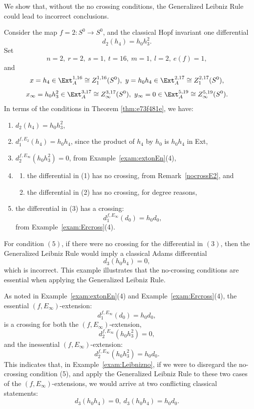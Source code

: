\documentclass{amsart}
\numberwithin{equation}{section}
\begin{document}
\begin{example} \label{exam:Leibnizno}
    We show that, without the no crossing conditions, the Generalized Leibniz Rule could lead to incorrect conclusions. 

    Consider the map $f=2: S^0 \rightarrow S^0$, and the classical Hopf invariant one differential
    $$d_2(h_4) = h_0 h_3^2.$$
    Set $$n=2, \ r=2, \ s=1, \ t=16, \ m=1, \ l=2, \ e(f)=1,$$
        and 
        $$x=h_4 \in \Ext_A^{1,16} \cong Z_1^{1,16}(S^0), \ y=h_0h_4 \in \Ext_A^{2,17} \cong Z_1^{2,17}(S^0),$$
        $$x_\infty=h_0h_3^2 \in \Ext_A^{3,17} \cong Z_\infty^{3,17}(S^0), \ y_\infty=0 \in \Ext_A^{5,19} \cong Z_\infty^{5,19}(S^0).$$
In terms of the conditions in Theorem \ref{thm:e73f481e}, we have:
 \begin{enumerate}
      \item $d_2(h_4) = h_0h_3^2$,
      \item $d_1^{f, E_2}(h_4) = h_0h_4$, since the product of $h_4$ by $h_0$ is $h_0h_4$ in Ext,
      \item $d_2^{f, E_\infty} (h_0h_3^2) = 0$, from Example~\ref{exam:extonEn}(4),
      \item 
      \begin{enumerate}
          \item the differential in (1) has no crossing, from Remark~\ref{nocrossE2}, and
          \item the differential in (2) has no crossing, for degree reasons, 
      \end{enumerate}
      \item the differential in (3) has a crossing:
      $$d_1^{f, E_\infty} (d_0) = h_0 d_0,$$
      from Example~\ref{exam:Ercross}(4).
      \end{enumerate}
      For condition $(5)$, if there were no crossing for the differential in $(3)$, then the Generalized Leibniz Rule would imply a classical Adams differential
      $$d_3(h_0h_4) = 0,$$
      which is incorrect. This example illustrates that the no-crossing conditions are essential when applying the Generalized Leibniz Rule.
\end{example}

\begin{remark}
    As noted in Example~\ref{exam:extonEn}(4) and Example~\ref{exam:Ercross}(4), the essential $(f, E_\infty)$-extension:
        $$d_1^{f, E_\infty} (d_0) = h_0 d_0,$$
        is a crossing for both the $(f, E_\infty)$-extension,
        $$d_2^{f, E_\infty} (h_0 h_3^2) = 0,$$
        and the inessential $(f, E_\infty)$-extension: 
        $$d_2^{f, E_\infty} (h_0 h_3^2) = h_0 d_0.$$
        This indicates that, in Example~\ref{exam:Leibnizno}, if we were to disregard the no-crossing condition (5), and apply the Generalized Leibniz Rule to these two cases of the $(f, E_\infty)$-extensions, we would arrive at two conflicting classical statements:
$$d_3(h_0h_4) = 0, \ d_3(h_0h_4) = h_0 d_0.$$
\end{remark}
\end{document}
